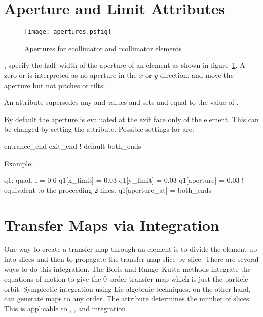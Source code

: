 \section{Aperture and Limit Attributes}
\label{s:limit}

\begin{figure}
  \centering
  \texttt{[image: apertures.psfig]}
  \caption{Apertures for ecollimator and rcollimator elements}
  \label{f:limit}
\end{figure}

,  specify the half--width of the aperture of
an element as shown in figure~\ref{f:limit}. A zero  or
 is interpreted as no aperture in the $x$ or $y$
direction.  and  move the aperture but not
pitches or tilts.

An  attribute supersedes
any  and  values and sets  and
 equal to the value of .

By default the aperture is evaluated at the exit face only of the
element. This can be changed by setting the  attribute.
Possible settings for  are:
\begin{example}
  entrance_end
  exit_end  ! default
  both_ends
\end{example}

Example:
\begin{example}
  q1: quad, l = 0.6
  q1[x_limit] = 0.03
  q1[y_limit] = 0.03
  q1[aperture] = 0.03  ! equivalent to the proceeding 2 lines.  
  q1[aperture_at] = both_ends
\end{example}

\section{Transfer Maps via Integration}
\label{s:integ}

One way to create a transfer map through an element is to divide the
element up into slices and then to propagate the transfer map slice by
slice.  There are several ways to do this integration. The Boris and
Runge--Kutta methods integrate the equations of motion to give the
0\Th\ order transfer map which is just the particle orbit.  Symplectic
integration using Lie algebraic techniques, on the other hand, can
generate maps to any order.  The  attribute determines
the number of slices. This is applicable to ,
, and  integration.

